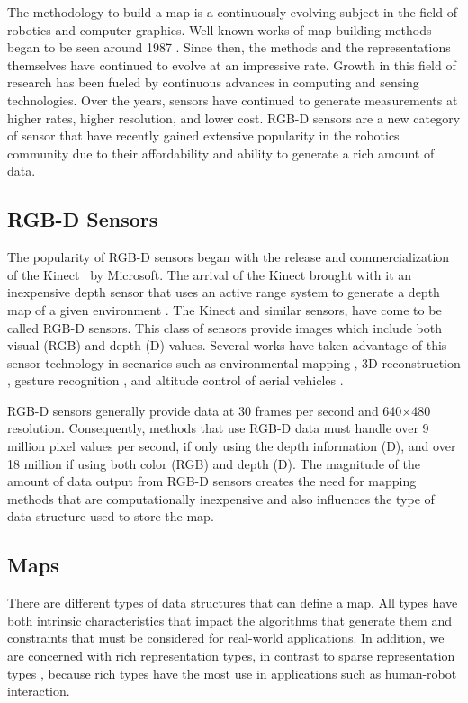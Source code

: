 The methodology to build a map is a continuously evolving subject in the field
of robotics and computer graphics. Well known works of map building methods
began to be seen around 1987 \cite{Lorensen1987}. Since then, the methods and
the representations themselves have continued to evolve at an impressive rate.
Growth in this field of research has been fueled by continuous advances in
computing and sensing technologies. Over the years, sensors have continued to
generate measurements at higher rates, higher resolution, and lower cost. RGB-D
sensors are a new category of sensor that have recently gained extensive
popularity in the robotics community due to their affordability and ability to
generate a rich amount of data.

\subsection{RGB-D Sensors}

The popularity of RGB-D sensors began with the release and commercialization of
the Kinect\texttrademark ~ by Microsoft. The arrival of the Kinect brought with
it an inexpensive depth sensor that uses an active range system to generate a
depth map of a given environment \cite{freedman2012depth}. The Kinect and
similar sensors, have come to be called RGB-D sensors. This class of sensors
provide images which include both visual (RGB) and depth (D) values. Several
works have taken advantage of this sensor technology in scenarios such as
environmental mapping \cite{henry2012rgb}, 3D reconstruction
\cite{Newcombe2011a}, gesture recognition \cite{Xia2011}, and altitude control
of aerial vehicles \cite{Stowers2011}.

RGB-D sensors generally provide data at 30 frames per second and 640$\times$480
resolution. Consequently, methods that use RGB-D data must handle over 9 million
pixel values per second, if only using the depth information (D), and over 18
million if using both color (RGB) and depth (D). The magnitude of the amount of
data output from RGB-D sensors creates the need for mapping methods that are
computationally inexpensive and also influences the type of data structure used
to store the map.

\subsection{Maps}

There are different types of data structures that can define a map. All types
have both intrinsic characteristics that impact the algorithms that generate
them and constraints that must be considered for real-world applications. In
addition, we are concerned with rich representation types, in contrast to sparse
representation types \cite{Dissanayake2001}, because rich types have the most
use in applications such as human-robot interaction.

